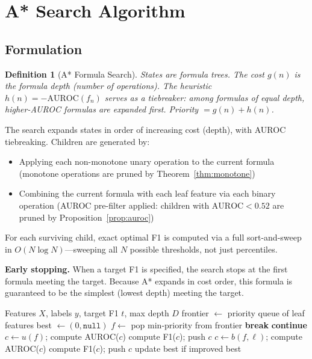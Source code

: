 \documentclass[journal]{IEEEtran}
\newtheorem{definition}{Definition}
\begin{document}
\section{A* Search Algorithm}

\subsection{Formulation}

\begin{definition}[A* Formula Search]
States are formula trees. The cost $g(n)$ is the formula depth
(number of operations). The heuristic $h(n) = -\mathrm{AUROC}(f_n)$
serves as a tiebreaker: among formulas of equal depth, higher-AUROC
formulas are expanded first. Priority $= g(n) + h(n)$.
\end{definition}

The search expands states in order of increasing cost (depth), with
AUROC tiebreaking. Children are generated by:
\begin{itemize}
\item Applying each non-monotone unary operation to the current formula
(monotone operations are pruned by Theorem~\ref{thm:monotone})
\item Combining the current formula with each leaf feature via each
binary operation (AUROC pre-filter applied: children with
$\mathrm{AUROC} < 0.52$ are pruned by Proposition~\ref{prop:auroc})
\end{itemize}

For each surviving child, exact optimal F1 is computed via a full
sort-and-sweep in $O(N \log N)$---sweeping all $N$ possible thresholds,
not just percentiles.

\textbf{Early stopping.} When a target F1 is specified, the search
stops at the first formula meeting the target. Because A* expands in
cost order, this formula is guaranteed to be the simplest (lowest depth)
meeting the target.

\begin{algorithm}[t]
\caption{A* Formula Search with Provable Pruning}
\label{alg:astar}
\begin{algorithmic}[1]
\Require Features $X$, labels $y$, target F1 $t$, max depth $D$
\State frontier $\gets$ priority queue of leaf features
\State best $\gets (0, \texttt{null})$
    \State $f \gets$ pop min-priority from frontier
        \State \textbf{break} 
    \EndIf
     \textbf{continue} \EndIf
        \State $c \gets u(f)$; compute AUROC($c$)
            compute F1($c$); push $c$
        \EndIf
    \EndFor
        \State $c \gets b(f, \ell)$; compute AUROC($c$)
            compute F1($c$); push $c$
        \EndIf
    \EndFor
    \State update best if improved
\EndWhile
\State \Return best
\end{algorithmic}
\end{algorithm}
\end{document}
